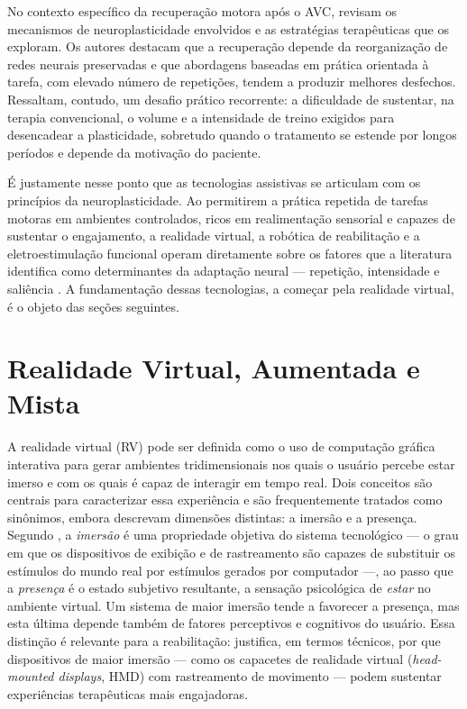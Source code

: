 No contexto específico da recuperação motora após o AVC, 
revisam os mecanismos de neuroplasticidade envolvidos e as estratégias terapêuticas que
os exploram. Os autores destacam que a recuperação depende da reorganização de redes
neurais preservadas e que abordagens baseadas em prática orientada à tarefa, com elevado
número de repetições, tendem a produzir melhores desfechos. Ressaltam, contudo, um
desafio prático recorrente: a dificuldade de sustentar, na terapia convencional, o volume
e a intensidade de treino exigidos para desencadear a plasticidade, sobretudo quando o
tratamento se estende por longos períodos e depende da motivação do paciente.

É justamente nesse ponto que as tecnologias assistivas se articulam com os princípios da
neuroplasticidade. Ao permitirem a prática repetida de tarefas motoras em ambientes
controlados, ricos em realimentação sensorial e capazes de sustentar o engajamento, a
realidade virtual, a robótica de reabilitação e a eletroestimulação funcional operam
diretamente sobre os fatores que a literatura identifica como determinantes da adaptação
neural --- repetição, intensidade e saliência \cite{rajashekar2024,macchitella2023}. A
fundamentação dessas tecnologias, a começar pela realidade virtual, é o objeto das seções
seguintes.

\section{Realidade Virtual, Aumentada e Mista}
\label{sec:rv-ra-rm}

A realidade virtual (RV) pode ser definida como o uso de computação gráfica interativa
para gerar ambientes tridimensionais nos quais o usuário percebe estar imerso e com os
quais é capaz de interagir em tempo real. Dois conceitos são centrais para caracterizar
essa experiência e são frequentemente tratados como sinônimos, embora descrevam dimensões
distintas: a imersão e a presença. Segundo , a \emph{imersão} é uma
propriedade objetiva do sistema tecnológico --- o grau em que os dispositivos de exibição
e de rastreamento são capazes de substituir os estímulos do mundo real por estímulos
gerados por computador ---, ao passo que a \emph{presença} é o estado subjetivo
resultante, a sensação psicológica de \emph{estar} no ambiente virtual. Um sistema de
maior imersão tende a favorecer a presença, mas esta última depende também de fatores
perceptivos e cognitivos do usuário. Essa distinção é relevante para a reabilitação:
justifica, em termos técnicos, por que dispositivos de maior imersão --- como os capacetes
de realidade virtual (\emph{head-mounted displays}, HMD) com rastreamento de movimento ---
podem sustentar experiências terapêuticas mais engajadoras.

